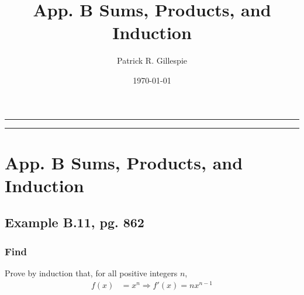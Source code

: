\documentclass[openany, article, a4paper]{memoir}
\title{\huge \textbf{App. B Sums, Products, and Induction}}
\author{Patrick R. Gillespie}
\date{\today}                    %
\begin{document}
\thispagestyle{empty}
\begin{center}{
	\begin{shaded}
	\hrule \vspace{30pt}
	\hspace{10pt} \thetitle  \vspace{30pt}
	\theauthor   \hspace{0.5 in}\thedate \vspace{26pt}
	\hrule
	\end{shaded}
	}
\end{center}

\clearpage


\pagestyle{Ruled}                    %
\midsloppy                             %


\checkandfixthelayout          %

\chapter{App. B Sums, Products, and Induction}
\section{Example B.11, pg. 862}
\subsection{Find}
Prove by induction that, for all positive integers $n$, 
	\begin{align}
		f(x)&=x^n \Longrightarrow f'(x)=nx^{n-1}
	\label{find}
	\end{align}
\end{document}
